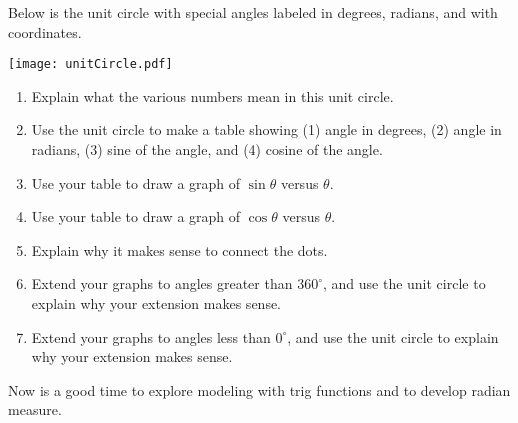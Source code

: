 \documentclass[nooutcomes]{ximera}
\begin{document}
\begin{problem}
Below is the unit circle with special angles labeled in degrees, radians, and with 
coordinates.
\begin{image}
\texttt{[image: unitCircle.pdf]}
\end{image}
\begin{enumerate}
\item Explain what the various numbers mean in this unit circle.  
\item Use the unit circle to make a table showing (1) angle in degrees, (2) angle in radians, (3) sine of the angle, and (4) cosine of the angle.  
\item Use your table to draw a graph of $\sin\theta$ versus $\theta$.
\item Use your table to draw a graph of $\cos\theta$ versus $\theta$.
\item Explain why it makes sense to connect the dots. 
\item Extend your graphs to angles greater than $360^\circ$, and use the unit circle to explain why your extension makes sense. 
\item Extend your graphs to angles less than $0^\circ$, and use the unit circle to explain why your extension makes sense.
\end{enumerate}
\vfill
\end{problem}

\begin{teachingnote}
Now is a good time to explore modeling with trig functions and to develop radian measure.  
\end{teachingnote}

%
%
%
\end{document}
